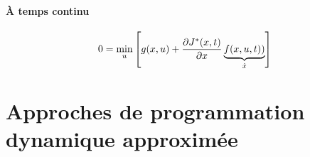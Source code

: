 \paragraph{À temps continu}

\begin{align}
0 =
\operatornamewithlimits{min}\limits_{u}
\left[
g(x , u ) + \frac{\partial	J^*(x,t)}{\partial x }
\underbrace{
f(x , u , t) )
}_{\dot{x}}
\right]
\label{eq:hjb}
\end{align} 


\newpage
\section{Approches de programmation dynamique approximée}

